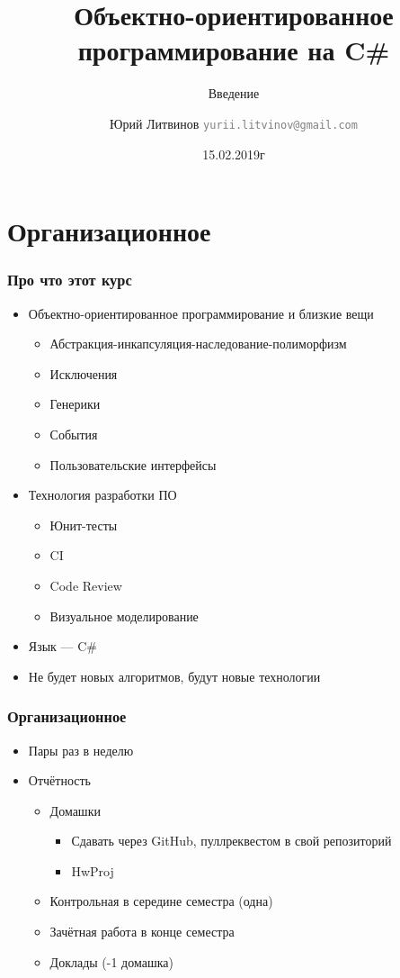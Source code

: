 \documentclass[xetex,mathserif,serif]{beamer}
\title{Объектно-ориентированное программирование на C\#}
\subtitle{Введение}
\author[Юрий Литвинов]{Юрий Литвинов \newline \textcolor{gray}{\small\texttt{yurii.litvinov@gmail.com}}}
\date{15.02.2019г}
\begin{document}
	
	\frame{\titlepage}

	\section{Организационное}

	\begin{frame}
		\frametitle{Про что этот курс}
		\begin{itemize}
			\item Объектно-ориентированное программирование и близкие вещи
			\begin{itemize}
				\item Абстракция-инкапсуляция-наследование-полиморфизм
				\item Исключения
				\item Генерики
				\item События
				\item Пользовательские интерфейсы
			\end{itemize}
			\item Технология разработки ПО
			\begin{itemize}
				\item Юнит-тесты
				\item CI
				\item Code Review
				\item Визуальное моделирование
			\end{itemize}
			\item Язык --- C\#
			\item Не будет новых алгоритмов, будут новые технологии
		\end{itemize}
	\end{frame}

	\begin{frame}
		\frametitle{Организационное}
		\begin{itemize}
			\item Пары раз в неделю
			\item Отчётность
			\begin{itemize}
				\item Домашки
				\begin{itemize}
					\item Сдавать через GitHub, пуллреквестом в свой репозиторий
					\item HwProj
				\end{itemize}
				\item Контрольная в середине семестра (одна)
				\item Зачётная работа в конце семестра
				\item Доклады (-1 домашка)
			\end{itemize}
		\end{itemize}
	\end{frame}
\end{document}
